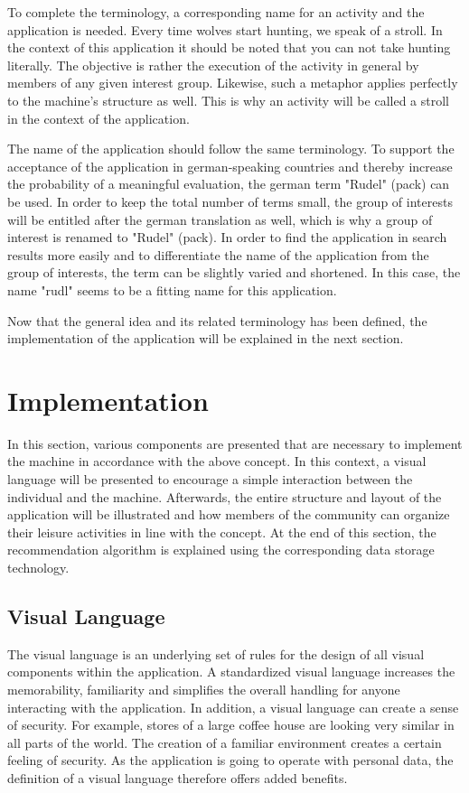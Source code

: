 \documentclass[12pt,numbers=noenddot,parskip,bibliography=totocnumbered,listof=totocnumbered,draft=true]{scrreprt}
\begin{document}
To complete the terminology, a corresponding name for an activity and the application is needed. Every time wolves start hunting, we speak of a stroll. In the context of this application it should be noted that you can not take hunting literally. The objective is rather the execution of the activity in general by members of any given interest group. Likewise, such a metaphor applies perfectly to the machine's structure as well. This is why an activity will be called a stroll in the context of the application.

The name of the application should follow the same terminology. To support the acceptance of the application in german-speaking countries and thereby increase the probability of a meaningful evaluation, the german term "Rudel" (pack) can be used. In order to keep the total number of terms small, the group of interests will be entitled after the german translation as well, which is why a group of interest is renamed to "Rudel" (pack). In order to find the application in search results more easily and to differentiate the name of the application from the group of interests, the term can be slightly varied and shortened. In this case, the name "rudl" seems to be a fitting name for this application.

Now that the general idea and its related terminology has been defined, the implementation of the application will be explained in the next section.

\section{Implementation}
In this section, various components are presented that are necessary to implement the machine in accordance with the above concept. In this context, a visual language will be presented to encourage a simple interaction between the individual and the machine. Afterwards, the entire structure and layout of the application will be illustrated and how members of the community can organize their leisure activities in line with the concept. At the end of this section, the recommendation algorithm is explained using the corresponding data storage technology.

\subsection{Visual Language} 
The visual language is an underlying set of rules for the design of all visual components within the application. A standardized visual language increases the memorability, familiarity and simplifies the overall handling for anyone interacting with the application. In addition, a visual language can create a sense of security. For example, stores of a large coffee house are looking very similar in all parts of the world. The creation of a familiar environment creates a certain feeling of security. As the application is going to operate with personal data, the definition of a visual language therefore offers added benefits.
\end{document}
